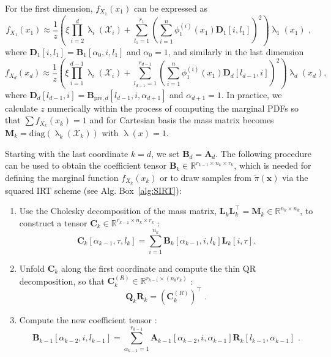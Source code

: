 For the first dimension, $f_{X_1}(x_1)$ can be expressed as \cite[Eq.~30]{cui2022deep}
\begin{equation}
	f_{X_1}(x_1)  \approx \frac{1}{z} \left(\xi \prod_{i=2}^{d} \uplambda_i(\mathcal{X}_i) + \sum_{l_1=1}^{r_1} \left(\sum_{i=1}^{n} \phi^{(i)}_1(x_1) \bm{D}_1[i, l_1] \right)^2 \right) \uplambda_1(x_1)\, \, ,
	\label{eq:firstMarg}
\end{equation}
where $\bm{D}_1[i, l_1] = \bm{B}_1[\alpha_0, i, l_1]$ and $\alpha_0 = 1$,
and similarly in the last dimension
\begin{equation}
	f_{X_d}(x_d)  \approx \frac{1}{z} \left(\xi \prod_{i=1}^{d-1} \uplambda_i(\mathcal{X}_i) + \sum_{l_{d-1}=1}^{r_{d-1}} \left(\sum_{i=1}^{n} \phi^{(i)}_1(x_1) \bm{D}_d[l_{d-1},i] \right)^2 \right) \uplambda_d(x_d),
\end{equation}
where $\bm{D}_d[l_{d-1},i] = \bm{B}_{\text{pre},d}[l_{d-1}, i, \alpha_{d+1}]$ and $\alpha_{d+1} = 1$.
In practice, we calculate $z$ numerically within the process of computing the marginal PDFs so that $\sum f_{X_k}(x_k) =1 $ and for Cartesian basis the mass matrix becomes $\bm{M}_k = \text{diag}(\uplambda_k(\mathcal{X}_k))$ with $\uplambda(x) = 1$.
\clearpage
\begin{prop}
	\label{prob:backMarg}
	Starting with the last coordinate $k = d$, we set $\bm{B}_d = \bm{A}_d$. The following procedure can be used to obtain the coefficient tensor $\bm{B}_{k} \in \mathbb{R}^{r_{k-1} \times n_{k} \times r_{k}}$, which is needed for defining the marginal function $f_{X_k}(x_k)$ or to draw samples from $\tilde{\pi}(\bm{x})$ via the squared IRT scheme (see Alg. Box~\ref{alg:SIRT}):
	\begin{enumerate}
		\item Use the Cholesky decomposition of the mass matrix, $\bm{L}_k \bm{L}_k^\top = \bm{M}_k \in \mathbb{R}^{n_k \times n_k}$, to construct a tensor $\bm{C}_k \in \mathbb{R}^{r_{k-1} \times n_k \times r_k}$ \cite[Eq.~27]{cui2022deep}:
		\begin{equation}
			\bm{C}_k[\alpha_{k-1}, \tau, l_k] = \sum_{i=1}^{n_k} \bm{B}_k[\alpha_{k-1}, i, l_k] \bm{L}_k[i, \tau]  \label{eq:constrCBack}.
		\end{equation}
		\item Unfold $\bm{C}_k$ along the first coordinate and compute the thin QR decomposition, so that $\bm{C}_k^{(R)} \in \mathbb{R}^{r_{k-1} \times (n_k r_k)}$  \cite[Eq.~28]{cui2022deep}:
		\begin{equation}
			\bm{Q}_k \bm{R}_k = {(\bm{C}_k^{(R)})}^{\top} \, \, .\label{eq:thinQRBack}
		\end{equation}
		\item Compute the new coefficient tensor \cite[Eq.~29]{cui2022deep}:
		\begin{equation}
			\bm{B}_{k-1}[\alpha_{k-2}, i, l_{k-1}] = \sum_{\alpha_{k-1}=1}^{r_{k-1}} \bm{A}_{k-1}[\alpha_{k-2}, i, \alpha_{k-1}] \bm{R}_k[l_{k-1}, \alpha_{k-1}]\, \,   \label{eq:nextCoeffTBack}.
		\end{equation}
	\end{enumerate}
\end{prop}
